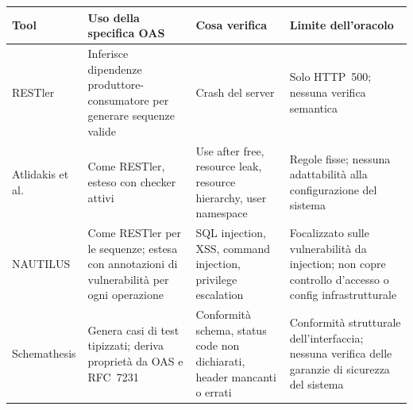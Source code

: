 \begin{table}[ht]
  \centering
  \small
  \begin{tabularx}{\textwidth}{@{\hspace{0.5em}} l >{\raggedright\arraybackslash}X >{\raggedright\arraybackslash}X >{\raggedright\arraybackslash}X @{\hspace{0.5em}}}
    \toprule
    \textbf{Tool}                                                     & \textbf{Uso della specifica OAS}                                                                    & \textbf{Cosa verifica}                                                                      & \textbf{Limite dell'oracolo}                                                                          \\
    \midrule
    RESTler \cite{atlidakisRESTlerStatefulREST2019a}                  & Inferisce dipendenze produttore-consumatore per generare sequenze valide                            & Crash del server                                                                            & Solo HTTP~500; nessuna verifica semantica                                                             \\
    \addlinespace
    Atlidakis et al. \cite{atlidakisCheckingSecurityProperties2020}   & Come RESTler, esteso con checker attivi                                                             & Use after free, resource leak, resource hierarchy, user namespace                           & Regole fisse; nessuna adattabilità alla configurazione del sistema                                    \\
    \addlinespace
    NAUTILUS \cite{dengNAUTILUSAutomatedRESTful2023}                  & Come RESTler per le sequenze; estesa con annotazioni di vulnerabilità per ogni operazione           & SQL injection, XSS, command injection, privilege escalation                                 & Focalizzato sulle vulnerabilità da injection; non copre controllo d'accesso o config infrastrutturale \\
    \addlinespace
    Schemathesis \cite{schemathesisDerivingSemanticsawareFuzzers2022} & Genera casi di test tipizzati; deriva proprietà da OAS e RFC~7231                                   & Conformità schema, status code non dichiarati, header mancanti o errati                     & Conformità strutturale dell'interfaccia; nessuna verifica delle garanzie di sicurezza del sistema     \\

\end{tabularx}
\end{table}
